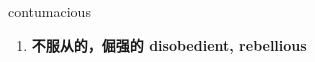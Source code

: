 
\begin{frame}
{\huge contumacious}
\begin{center}
\begin{enumerate}\Large
  \item \textbf{不服从的，倔强的 disobedient, rebellious}
\end{enumerate}
\end{center}
\end{frame}
